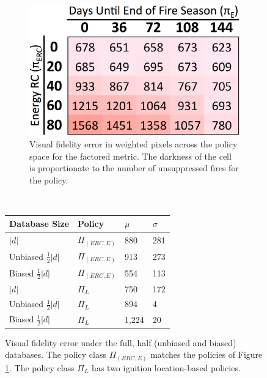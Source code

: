 \documentclass{article}
\begin{document}
\begin{figure}
    \centering
    \begin{subfigure}[b]{0.49\textwidth}
        \includegraphics[width=.88\textwidth]{png/heatmap2.png}
        \caption{
          Visual fidelity error in weighted pixels
          across the policy space for the factored metric.
          The darkness of the cell is proportionate to the number of unsuppressed
          fires for the policy.
          }
        \label{fig:factored-fidelity}
    \end{subfigure}
    ~ %
    \begin{subtable}[b]{0.49\textwidth}
        \centering
        \begin{tabular}{llll}
          \toprule
          Database Size & Policy & $\mu$ & $\sigma$ \\
          \midrule
          $|d|$ & $\Pi_{(ERC,E)}$ & 880 & 281 \\
          Unbiased $\frac{1}{2}|d|$  & $\Pi_{(ERC,E)}$ & 913 & 273  \\
          Biased $\frac{1}{2}|d|$ & $\Pi_{(ERC,E)}$ & 554 & 113 \\
          $|d|$ & $\Pi_{L}$ & 750 & 172 \\
          Unbiased $\frac{1}{2}|d|$ & $\Pi_{L}$ &  894 &  4 \\
          Biased $\frac{1}{2}|d|$ & $\Pi_{L}$ &  1,224 &  20  \\
          \bottomrule
        \end{tabular}
        \caption{
        Visual fidelity error under the full, half (unbiased and biased) databases.
        The policy class $\Pi_{(ERC,E)}$ matches the policies of
        Figure \ref{fig:factored-fidelity}.
        The policy class $\Pi_{L}$ has two ignition location-based policies.
        }
        \label{tab:debiased}
    \end{subtable}
\end{figure}
\end{document}
